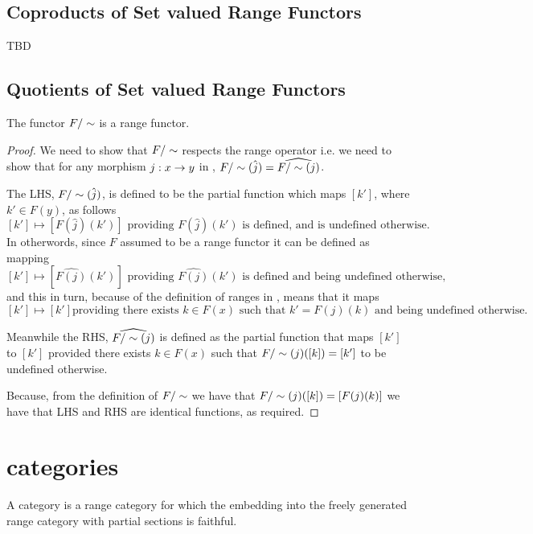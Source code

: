 \subsection{Coproducts of Set valued Range Functors}
TBD
\subsection{Quotients of Set valued Range Functors}
\begin{lemma}
\label{rangefunctorquotient}
The functor $F/\sim$ is a range functor.
\end{lemma}
\begin{proof} 
We need to show that  $F/\sim$ respects the range operator
i.e. we need to show that for any morphism $j:x \rightarrow y$ in \catcw, 
 $F/\sim(\hat{j})= \widehat{F/\sim(j)}$.

The LHS, $F/\sim(\hat{j})$, is defined to  be 
the partial function which maps $[k']$, where $k' \in F(y)$, as follows
$$ [k'] \mapsto [F(\hat{j})(k')] \mbox{ providing $F(\hat{j})(k')$ is defined, and is undefined otherwise.}$$
In otherwords, since  $F$ assumed to be a range functor it can be defined as mapping
$$ [k'] \mapsto [\widehat{F(j)}(k')] \mbox{ providing $\widehat{F(j)}(k')$ is defined and being undefined otherwise,}$$
and this in turn, because of the definition of ranges in \SetP, means that it maps
$$ [k'] \mapsto [k'] \mbox{providing there exists $k \in F(x)$ such that $k'=F(j)(k)$ and being undefined otherwise.}$$

Meanwhile the RHS, $\widehat{F/\sim(j)}$  is defined as the partial function that 
maps $[k']$  to $[k']$  provided  there exists $k \in F(x)$ such that
$F/\sim(j)([k])=[k']$ to be undefined otherwise.

Because,
from the definition of $F/\sim$ we have that $F/\sim(j)([k])= [F(j)(k)]$   
we have  that LHS and RHS are identical functions, as required.
\end{proof}

\section{\rangeplus categories}
A \rangeplus category is a range category for which the embedding into the freely 
generated range category with partial sections is faithful.